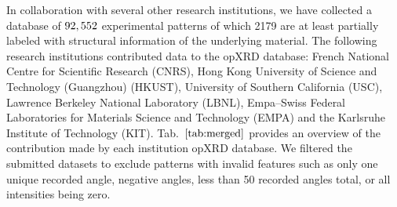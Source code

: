In collaboration with several other research institutions, we have collected a database of $92,552$ experimental patterns of which 2179 are at least partially labeled with structural information of the underlying material.  The following research institutions contributed data to the opXRD database: French National Centre for Scientific Research (CNRS), Hong Kong University of Science and Technology (Guangzhou) (HKUST), University of Southern California (USC), Lawrence Berkeley National Laboratory (LBNL), Empa–Swiss Federal Laboratories for Materials Science and Technology (EMPA) and the Karlsruhe Institute of Technology (KIT). Tab.~$\eqref{tab:merged}$ provides an overview of the contribution made by each institution opXRD database. We filtered the submitted datasets to exclude patterns with invalid features such as only one unique recorded angle, negative angles, less than 50 recorded angles total, or all intensities being zero. \\

\begin{table}[!htb]
\centering
\caption{\footnotesize Overview of the contributions to the opXRD database: The availability of the chemical composition, spacegroups, lattice parameters, and atomic coordinates of the underlying samples are indicated by the columns ``Comp.'', ``Spg.'', ``Lattice'' and ``Atom coords.'' respectively.}
\label{tab:merged}
\end{table}

